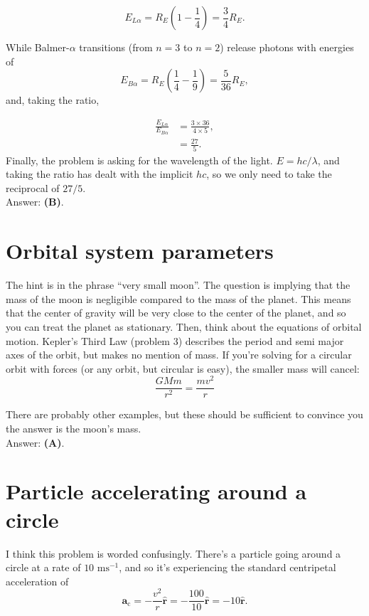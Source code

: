 \documentclass[11pt]{paper}
\newcommand{\answer}[1]{Answer: \textbf{(#1)}.}
\begin{document}
\begin{equation}
E_{L\alpha} = R_E \left(1 - \frac{1}{4}\right) = \frac{3}{4}R_E.
\end{equation}

While Balmer-$\alpha$ transitions (from $n=3$ to $n=2$) release photons with energies of 
\begin{equation}
E_{B\alpha} = R_E \left(\frac{1}{4} - \frac{1}{9}\right) = \frac{5}{36}R_E,
\end{equation}
and, taking the ratio,

\begin{align}
\frac{E_{L\alpha}}{E_{B\alpha}} &= \frac{3 \times 36}{4 \times 5},\\
&= \frac{27}{5}.
\end{align}
Finally, the problem is asking for the wavelength of the light.  $E = hc/\lambda$, and taking the ratio has dealt with the implicit $hc$, so we only need to take the reciprocal of $27/5$.\\

\answer{B}

\section{Orbital system parameters}

The hint is in the phrase ``very small moon''.  The question is implying that the mass of the moon is negligible compared to the mass of the planet.  This means that the center of gravity will be very close to the center of the planet, and so you can treat the planet as stationary.  Then, think about the equations of orbital motion.  Kepler's Third Law (problem 3) describes the period and semi major axes of the orbit, but makes no mention of mass.  If you're solving for a circular orbit with forces (or any orbit, but circular is easy), the smaller mass will cancel:
\begin{equation}
\frac{G M m}{r^2} = \frac{m v^2}{r}
\end{equation}

There are probably other examples, but these should be sufficient to convince you the answer is the moon's mass.\\

\answer{A}

\section{Particle accelerating around a circle}
I think this problem is worded confusingly.  There's a particle going around a circle at a rate of $10\text{ ms}^{-1}$, and so it's experiencing the standard centripetal acceleration of
\begin{equation}
\mathbf{a}_{\text{c}} = - \frac{v^2}{r}\mathbf{\hat{r}} = -\frac{100}{10}\mathbf{\hat{r}} = -10 \mathbf{\hat{r}} .
\end{equation}
\end{document}
